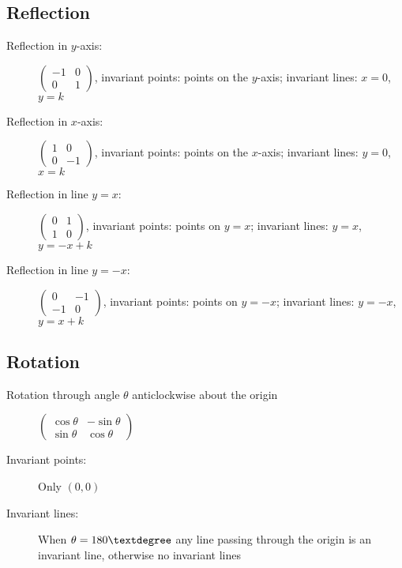 \subsection{Reflection}
\begin{description}
	\item[Reflection in $y$-axis:] $\begin{pmatrix}
		-1&0\\0&1
	\end{pmatrix}$, invariant points: points on the $y$-axis; invariant lines: $x=0$, $y=k$
	\item[Reflection in $x$-axis:] $\begin{pmatrix}
		1&0\\0&-1
	\end{pmatrix}$, invariant points: points on the $x$-axis; invariant lines: $y=0$, $x=k$
	\item[Reflection in line $y=x$:] $\begin{pmatrix}
		0&1\\1&0
	\end{pmatrix}$, invariant points: points on $y=x$; invariant lines: $y=x$, $y=-x+k$
	\item[Reflection in line $y=-x$:] $\begin{pmatrix}
		0&-1\\-1&0
	\end{pmatrix}$, invariant points: points on $y=-x$; invariant lines: $y=-x$, $y=x+k$
\end{description}

\subsection{Rotation}
\begin{description}
	\item[Rotation through angle $\theta$ anticlockwise about the origin] $\begin{pmatrix}
		\cos\theta&-\sin\theta\\\sin\theta&\cos\theta
	\end{pmatrix}$
	\item[Invariant points:] Only $(0,0)$
	\item[Invariant lines:] When $\theta=180\textdegree$ any line passing through the origin is an invariant line, otherwise no invariant lines
\end{description}

